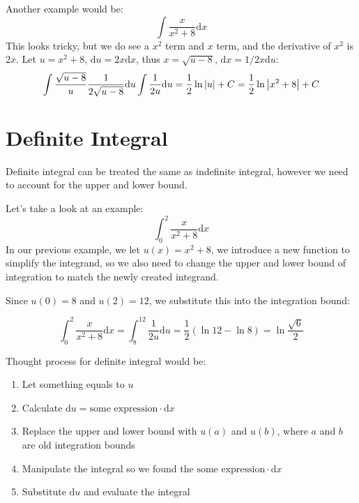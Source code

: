 \documentclass{article}
\numberwithin{equation}{section}
\begin{document}
Another example would be:
\[
\int \frac{x}{x^2+8}\mathrm{d}x
\]
This looks tricky, but we do see a $x^2$ term and $x$ term, and the derivative of $x^2$ is $2x$.
Let $u = x^2+8$, $\mathrm{d}u = 2x \mathrm{d}x$, thus $x = \sqrt{u - 8}$, $\mathrm{d}x = 1/2x \mathrm{d}u$:
\[
\int \frac{\sqrt{u - 8}}{u} \frac{1}{2\sqrt{u - 8}}\mathrm{d}u\int \frac{1}{2u} \mathrm{d}u = \frac{1}{2} \ln{\abs{u}} + C = \frac{1}{2} \ln{\abs{x^2+8}} + C
\]

\section{Definite Integral}
Definite integral can be treated the same as indefinite integral, however we need to account for the upper and lower bound.

Let's take a look at an example:
\[
\int_{0}^{2} \frac{x}{x^2+8}\mathrm{d}x
\]
In our previous example, we let $u(x) = x^2+8$, we introduce a new function to simplify the integrand,
so we also need to change the upper and lower bound of integration to match the newly created integrand.

Since $u(0) = 8$ and $u(2) = 12$, we substitute this into the integration bound:

\[
\int_{0}^{2} \frac{x}{x^2+8}\mathrm{d}x = \int_{8}^{12} \frac{1}{2u}\mathrm{d}u = \frac{1}{2} (\ln{12}-\ln{8}) = \ln{\frac{\sqrt{6}}{2}}
\]

Thought process for definite integral would be:
\begin{enumerate}
    \item Let something equals to $u$
    \item Calculate $\mathrm{d}u = \text{some expression} \cdot \mathrm{d}x$
    \item Replace the upper and lower bound with $u(a)$ and $u(b)$, where $a$ and $b$ are old integration bounds
    \item Manipulate the integral so we found the $\text{some expression} \cdot \mathrm{d}x$
    \item Substitute $\mathrm{d}u$ and evaluate the integral
\end{enumerate}
\end{document}
